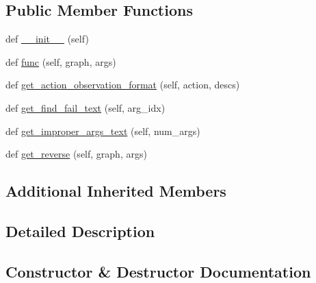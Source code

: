 \subsection*{Public Member Functions}
\begin{DoxyCompactItemize}
\item 
def \hyperlink{classlight__chats_1_1graph_1_1ExamineFunction_a7a65285c10c54ae332ee6252dca6cbe1}{\+\_\+\+\_\+init\+\_\+\+\_\+} (self)
\item 
def \hyperlink{classlight__chats_1_1graph_1_1ExamineFunction_a5a9150659aa698ebf73e302056c5ba46}{func} (self, graph, args)
\item 
def \hyperlink{classlight__chats_1_1graph_1_1ExamineFunction_ae3397289f3f0751980ba2a2165af82dc}{get\+\_\+action\+\_\+observation\+\_\+format} (self, action, descs)
\item 
def \hyperlink{classlight__chats_1_1graph_1_1ExamineFunction_a0f0eedfae1c6a0cdf83f94c6bc709128}{get\+\_\+find\+\_\+fail\+\_\+text} (self, arg\+\_\+idx)
\item 
def \hyperlink{classlight__chats_1_1graph_1_1ExamineFunction_a93ba8b835d12b96746a1548583e62887}{get\+\_\+improper\+\_\+args\+\_\+text} (self, num\+\_\+args)
\item 
def \hyperlink{classlight__chats_1_1graph_1_1ExamineFunction_ab489f99594157bdf84e8c67e7f9504bc}{get\+\_\+reverse} (self, graph, args)
\end{DoxyCompactItemize}
\subsection*{Additional Inherited Members}


\subsection{Detailed Description}
\begin{DoxyVerb}
\end{DoxyVerb}
 

\subsection{Constructor \& Destructor Documentation}
\mbox{\label{classlight__chats_1_1graph_1_1ExamineFunction_a7a65285c10c54ae332ee6252dca6cbe1}} 
